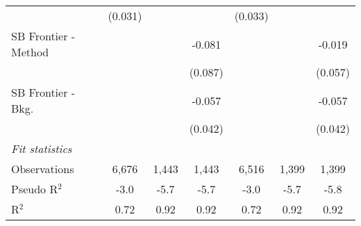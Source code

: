 \begin{tabular}{lcccccc}
                                & (0.031)        &               &                & (0.033)        &              &   \\   
   SB Frontier - Method         &                &               & -0.081         &                &              & -0.019\\   
                                &                &               & (0.087)        &                &              & (0.057)\\   
   SB Frontier - Bkg.           &                &               & -0.057         &                &              & -0.057\\   
                                &                &               & (0.042)        &                &              & (0.042)\\   
   \midrule
   \emph{Fit statistics}\\
   Observations                 & 6,676          & 1,443         & 1,443          & 6,516          & 1,399        & 1,399\\  
   Pseudo R$^2$                 & -3.0           & -5.7          & -5.7           & -3.0           & -5.7         & -5.8\\  
   R$^2$                        & 0.72           & 0.92          & 0.92           & 0.72           & 0.92         & 0.92\\  
   

\end{tabular}

